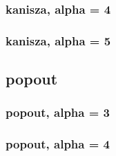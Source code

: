 \documentclass[10pt,a4paper]{article}
\begin{document}
\subsubsection{kanisza, alpha = 4}

\subsubsection{kanisza, alpha = 5}



\subsection{popout}

\subsubsection{popout, alpha = 3}

\subsubsection{popout, alpha = 4}

\end{document}
